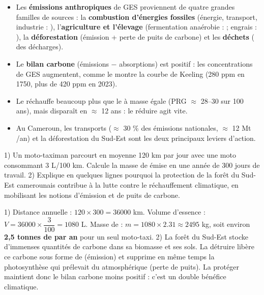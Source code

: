 \documentclass[11pt]{article}
\begin{document}
\begin{aretenir}
\begin{itemize}
\item Les \textbf{émissions anthropiques} de GES proviennent de quatre grandes familles de sources : la \textbf{combustion d'énergies fossiles} (énergie, transport, industrie : ), l'\textbf{agriculture et l'élevage} (fermentation anaérobie :  ; engrais : ), la \textbf{déforestation} (émission + perte de puits de carbone) et les \textbf{déchets} ( des décharges).
\item Le \textbf{bilan carbone} (émissions $-$ absorptions) est positif : les concentrations de GES augmentent, comme le montre la courbe de Keeling (280 ppm en 1750, plus de 420 ppm en 2023).
\item Le  réchauffe beaucoup plus que le  à masse égale (PRG $\approx$ 28--30 sur 100 ans), mais disparaît en $\approx$ 12 ans : le réduire agit vite.
\item Au Cameroun, les transports ($\approx$ 30 \% des émissions nationales, $\approx$ 12 Mt /an) et la déforestation du Sud-Est sont les deux principaux leviers d'action.
\end{itemize}
\end{aretenir}

\begin{exercice}
1) Un moto-taximan parcourt en moyenne 120 km par jour avec une moto consommant 3 L/100 km. Calcule la masse de  émise en une année de 300 jours de travail. 2) Explique en quelques lignes pourquoi la protection de la forêt du Sud-Est camerounais contribue à la lutte contre le réchauffement climatique, en mobilisant les notions d'émission et de puits de carbone.
\end{exercice}

\begin{corrige}[Exercice]
1) Distance annuelle : $120 \times 300 = \num{36000}$ km. Volume d'essence : $V = \num{36000} \times \dfrac{3}{100} = \num{1080}$ L. Masse de  : $m = \num{1080} \times \num{2,31} \approx \num{2495}$ kg, soit environ \textbf{2,5 tonnes de  par an} pour un seul moto-taxi. 2) La forêt du Sud-Est stocke d'immenses quantités de carbone dans sa biomasse et ses sols. La détruire libère ce carbone sous forme de  (émission) et supprime en même temps la photosynthèse qui prélevait du  atmosphérique (perte de puits). La protéger maintient donc le bilan carbone moins positif : c'est un double bénéfice climatique.
\end{corrige}
\end{document}
